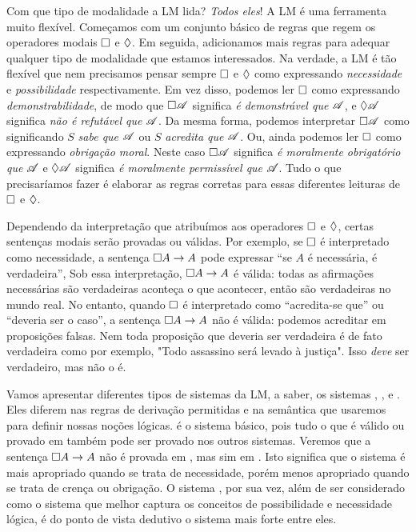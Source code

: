 Com que tipo de modalidade a LM lida? \emph{Todos eles}! A LM é uma ferramenta muito flexível. Começamos com um conjunto básico de regras que regem os operadores modais $\Box$ e $\Diamond$. Em seguida,  adicionamos mais regras para  adequar qualquer tipo de modalidade que estamos interessados.  Na verdade, a LM é tão flexível que nem precisamos pensar sempre  $\Box$ e $\Diamond$ como expressando \emph{necessidade} e \emph{possibilidade} respectivamente. Em vez disso, podemos ler $\Box$ como expressando \emph{demonstrabilidade}, de modo que $\Box\mathscr{A}$ significa   \emph{é demonstrável que} $\mathscr{A}$, e $\Diamond\mathscr{A}$ significa \emph{não é refutável que}  $\mathscr{A}$. Da mesma forma, podemos interpretar $\Box\mathscr{A}$ como significando  $S$ \emph{sabe que  $\mathscr{A}$} ou $S$ \emph{acredita que $\mathscr{A}$}. 
Ou, ainda podemos ler $\Box$ como expressando  \emph{obrigação moral}. Neste caso $\Box \mathscr{A}$ significa \emph{é moralmente obrigatório que} $\mathscr{A}$ e $\Diamond \mathscr{A}$ significa \emph{é moralmente permissível que} $\mathscr{A}$. Tudo o que precisaríamos fazer é elaborar as regras corretas para essas diferentes leituras de  $\Box$ e $\Diamond$.

  Dependendo da interpretação que atribuímos aos operadores $\Box$ e $\Diamond$, certas sentenças modais serão provadas ou válidas. Por exemplo,  se $\Box$ é interpretado como necessidade, a sentença  $\Box A \rightarrow A$ pode expressar ``se $A$ é necessária, é verdadeira'',
  Sob essa  interpretação,  $\Box A \rightarrow A$ é válida: todas as afirmações necessárias são verdadeiras aconteça o que acontecer, então são verdadeiras no mundo real. No entanto, quando   $\Box$  é interpretado como “acredita-se que” ou “deveria ser o caso”,  a sentença 
  $\Box A \rightarrow A$ não é válida: podemos acreditar em proposições falsas. Nem toda proposição que deveria ser verdadeira é de fato verdadeira como por exemplo, "Todo assassino será levado à justiça". Isso \emph{deve}  ser verdadeiro, mas não o é.

Vamos apresentar diferentes tipos de sistemas da LM, a saber, os sistemas  \mlK, \mlT, \mlSfour{} e \mlSfive.  Eles diferem nas regras de derivação permitidas e na semântica que usaremos para definir nossas noções lógicas.  \mlK{} é o sistema  básico, pois tudo o que é válido ou provado em \mlK{} também pode ser provado nos outros sistemas. 
Veremos que a sentença  $\Box A \rightarrow A$   não é provada em \mlK, mas sim em  \mlT. Isto significa que o sistema \mlT{} é mais apropriado quando se trata de necessidade, porém menos apropriado quando se trata de crença ou obrigação.
 O  sistema  \mlSfive, por sua vez, além de ser considerado como o sistema que melhor captura os conceitos de possibilidade e necessidade lógica, é do ponto de vista dedutivo o sistema mais forte entre eles. 
 

